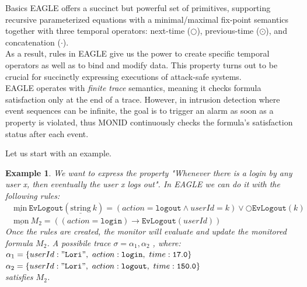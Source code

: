 \documentclass[aspectratio=169,t,xcolor=table]{beamer}
\newtheorem{ex}{Example}
\begin{document}
\begin{frame}[allowframebreaks]{Basics}
    EAGLE offers a succinct but powerful set of primitives, supporting recursive parameterized equations with a minimal/maximal fix-point semantics together with three temporal operators: next-time ($\bigcirc$), previous-time ($\odot$), and concatenation ($\cdot$).\\
    \vspace{2.5mm}
    As a result, rules in EAGLE give us the power to create specific temporal operators as well as to bind and modify data. This property turns out to be crucial for succinctly expressing executions of attack-safe systems.\\
    \vspace{2.5mm}
    EAGLE operates with \textit{finite trace} semantics, meaning it checks formula satisfaction only at the end of a trace. However, in intrusion detection where event sequences can be infinite, the goal is to trigger an alarm as soon as a property is violated, thus MONID continuously checks the formula's satisfaction status after each event.\\
    \vspace{2.5mm}
    
    Let us start with an example.
    \begin{ex} 
    We want to express the property "\textit{Whenever there is a login by any user x, then eventually the user x logs out}". In EAGLE we can do it with the following rules:\\
    \vspace{2.5mm}
    $\quad \underline{\text{min}}\ \mathtt{EvLogout}(\underline{\text{string}}\ k) = (action = \mathtt{logout}\land userId = k) \lor \bigcirc \mathtt{EvLogout}(k) $\\
    $\quad \underline{\text{mon}}\ M_2 = ((action = \mathtt{login})\rightarrow \mathtt{EvLogout}(userId)) $\\
    \vspace{2.5mm}
    Once the rules are created, the monitor will evaluate and update the monitored formula $M_2$. 
    A possibile trace $\sigma=\alpha_1,\alpha_2 $ , where:\\
    \vspace{2.5mm} 
    $\alpha_1=\{userId:\mathtt{"Lori"},\ action:\mathtt{login},\ time:\mathtt{17.0}\}$ \\$\alpha_2=\{userId:\mathtt{"Lori"},\ action:\mathtt{logout},\ time:\mathtt{150.0}\}$\\ 
    \vspace{2.5mm}
    satisfies $M_2$.
    \end{ex}
\end{frame}
\end{document}
